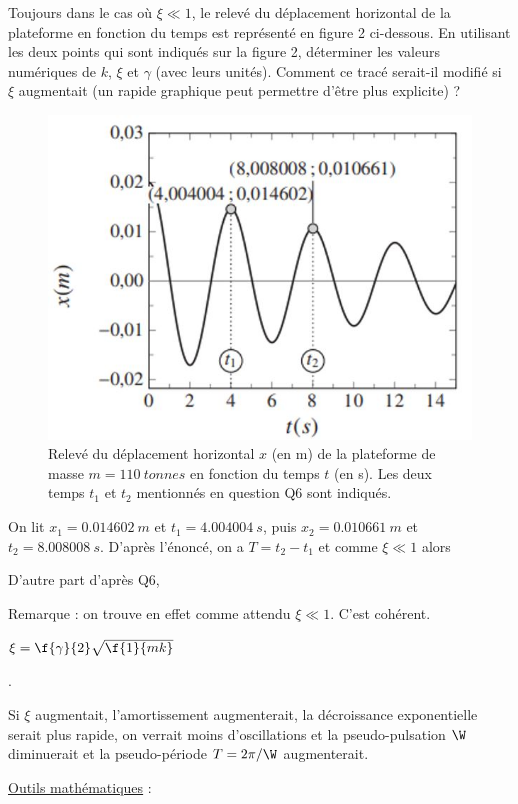 \documentclass[a4paper, 10pt, garamond]{book}
\begin{document}
\QR
{Toujours dans le cas où $\xi\ll 1$, le relevé du déplacement horizontal de la plateforme en fonction du temps 
est représenté en figure 2 ci-dessous. En utilisant les deux points qui sont indiqués sur la figure 2, déterminer les valeurs numériques de $k$, $\xi$ et $\gamma$ (avec leurs unités). Comment ce tracé serait-il modifié si $\xi$ augmentait (un rapide graphique peut permettre d’être plus explicite) ? 

\begin{figure}[htbp!]
  \centering
  \includegraphics[width=.6\linewidth]{P2graph}
  \caption{ Relevé du déplacement horizontal $x$ (en m) de la plateforme de
  masse $m = \SI{110}{tonnes}$ en fonction du temps $t$ (en s). Les deux temps
$t_1$ et $t_2$ mentionnés en question Q6 sont indiqués.}
  \label{fig:P2graph}
\end{figure}

}
{
On lit $x_1=\SI{0,014602}{m}$ et $t_1=\SI{4,004004}{s}$, puis $x_2=\SI{0,010661}{m}$ et $t_2=\SI{8,008008}{s}$.
	D’après l’énoncé, on a  $T=t_2-t_1$ et comme $\xi \ll 1$ alors
	
	
 
 

 \noindent
	D’autre part d’après Q6, 
	
	 
\noindent
Remarque : on trouve en effet comme attendu $\xi\ll1$. C'est cohérent. 

\medskip

 {$\xi=\f{\gamma}{2}\sqrt{\f{1}{mk}}$}
	
 .

\noindent
	Si $\xi$ augmentait, l’amortissement augmenterait, la décroissance exponentielle serait plus rapide, on 
verrait moins d’oscillations et la pseudo-pulsation $\W$  diminuerait et la pseudo-période $T={2\pi}/{\W}$ augmenterait.
}

\enonce
{
\medskip

\noindent
\underline{Outils mathématiques} : 		

}
\end{document}
